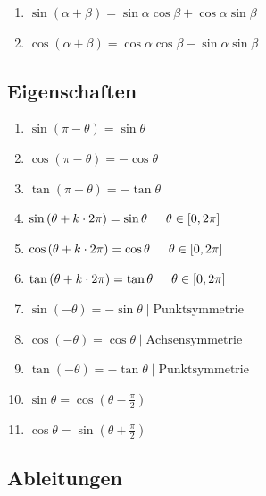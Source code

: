 \documentclass{article}
\begin{document}
\begin{enumerate}[label=$\bullet$]
    \item $\sin{(\alpha + \beta)} = \sin\alpha \cos\beta + \cos\alpha \sin\beta$
    \item $\cos{(\alpha + \beta)} = \cos\alpha \cos\beta - \sin\alpha \sin\beta$
\end{enumerate}

\subsection*{Eigenschaften}

\begin{enumerate}[label=$\bullet$]
    \item $\sin{(\pi - \theta)} =  \sin\theta$
    \item $\cos{(\pi - \theta)} = -\cos\theta$
    \item $\tan{(\pi - \theta)} = -\tan\theta$ \\
    
    \item $\sin{(\theta + k \cdot 2\pi)} = \sin\theta \hspace*{15pt} \theta \in [0, 2\pi]$
    \item $\cos{(\theta + k \cdot 2\pi)} = \cos\theta \hspace*{15pt} \theta \in [0, 2\pi]$
    \item $\tan{(\theta + k \cdot 2\pi)} = \tan\theta \hspace*{15pt} \theta \in [0, 2\pi]$ \\
    
    \item $\sin{(- \theta)} = -\sin\theta \mid \mbox{Punktsymmetrie}$
    \item $\cos{(- \theta)} =  \cos\theta \mid \mbox{Achsensymmetrie}$
    \item $\tan{(- \theta)} = -\tan\theta \mid \mbox{Punktsymmetrie}$ \\
    
    \item $\sin\theta = \cos(\theta - \frac{\pi}{2})$
    \item $\cos\theta = \sin(\theta + \frac{\pi}{2})$
\end{enumerate}

\subsection*{Ableitungen}
\end{document}
